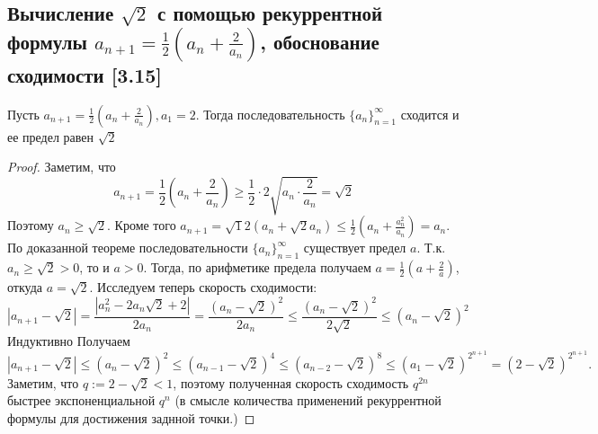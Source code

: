 \documentclass[12pt, a4paper]{article}
\begin{document}
    \subsection{Вычисление $\sqrt{2}$ с помощью рекуррентной формулы $a_{n+1} = \frac{1}{2} \left(a_n + \frac{2}{a_n}\right)$, обоснование сходимости [3.15]}
    Пусть $a_{n + 1} = \frac{1}{2} \left(a_n + \frac{2}{a_n}\right), a_1 = 2$. Тогда последовательность $\{a_n\}^{\infty}_{n=1}$ сходится и ее предел равен $\sqrt{2}$
    \begin{proof}
    Заметим, что 
    \begin{equation*}
        a_{n + 1} = \frac{1}{2} \left(a_n + \frac{2}{a_n}\right) \geq \frac{1}{2} \cdot 2\sqrt{a_n \cdot \frac{2}{a_n}} = \sqrt{2}
    \end{equation*}
    Поэтому $a_n \geq \sqrt{2}$. Кроме того $a_{n + 1} = \sqrt{1}{2} \left(a_n + \sqrt{2}{a_n}\right) \leq \frac{1}{2} \left(a_n + \frac{a_n^2}{a_n}\right) = a_n$. По доказанной теореме последовательности $\{a_n\}^{\infty}_{n=1}$ существует предел $a$. Т.к. $a_n \geq \sqrt{2} > 0$, то и $a > 0$. Тогда, по арифметике предела получаем $a = \frac{1}{2} \left(a + \frac{2}{a}\right)$, откуда $a = \sqrt{2}$. Исследуем теперь скорость сходимости:
    \begin{equation*}
        \left|a_{n + 1} - \sqrt{2}\right| = \frac{|a^2_n - 2a_n \sqrt{2} + 2|}{2 a_n} = \frac{(a_n - \sqrt{2})^2}{2a_n} \leq \frac{(a_n - \sqrt{2})^2}{2 \sqrt{2}} \leq \left(a_n - \sqrt{2}\right)^2
    \end{equation*}
    Индуктивно Получаем
    \begin{equation*}
        \left|a_{n + 1} - \sqrt{2}\right| \leq \left(a_n - \sqrt{2}\right)^2 \leq \left(a_{n-1} - \sqrt{2}\right)^4 \leq \left(a_{n-2} - \sqrt{2}\right)^8 \leq \left(a_1 - \sqrt{2}\right)^{2^{n + 1}} = (2 - \sqrt{2})^{2^{n+1}}.
    \end{equation*}
    Заметим, что $q := 2 - \sqrt{2} < 1$, поэтому полученная скорость сходимость $q^{2n}$ быстрее экспоненциальной $q^n$ (в смысле количества применений рекуррентной формулы для достижения заднной точки.)
    \end{proof}
\end{document}
